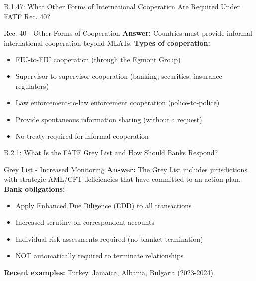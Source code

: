 \documentclass{beamer}
\begin{document}
	\begin{frame}{B.1.47: What Other Forms of International Cooperation Are Required Under FATF Rec. 40?}
		\begin{block}{Rec. 40 - Other Forms of Cooperation}
			\textbf{Answer:} Countries must provide informal international cooperation beyond MLATs.
			\vspace{0.2cm}
			\textbf{Types of cooperation:}
			\begin{itemize}
				\item FIU-to-FIU cooperation (through the Egmont Group)
				\item Supervisor-to-supervisor cooperation (banking, securities, insurance regulators)
				\item Law enforcement-to-law enforcement cooperation (police-to-police)
				\item Provide spontaneous information sharing (without a request)
				\item No treaty required for informal cooperation
			\end{itemize}
		\end{block}
	\end{frame}
	
	
	\begin{frame}{B.2.1: What Is the FATF Grey List and How Should Banks Respond?}
		\begin{block}{Grey List - Increased Monitoring}
			\textbf{Answer:} The Grey List includes jurisdictions with strategic AML/CFT deficiencies that have committed to an action plan.
			\vspace{0.2cm}
			\textbf{Bank obligations:}
			\begin{itemize}
				\item Apply Enhanced Due Diligence (EDD) to all transactions
				\item Increased scrutiny on correspondent accounts
				\item Individual risk assessments required (no blanket termination)
				\item NOT automatically required to terminate relationships
			\end{itemize}
			\textbf{Recent examples:} Turkey, Jamaica, Albania, Bulgaria (2023-2024).
		\end{block}
	\end{frame}
	
\end{document}
